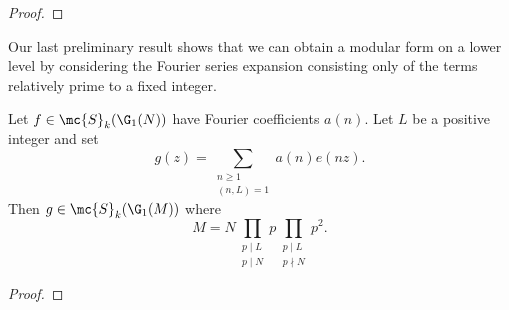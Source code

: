 \documentclass[12pt]{article}
\begin{document}
\begin{proof}

      \end{proof}

      Our last preliminary result shows that we can obtain a modular form on a lower level by considering the Fourier series expansion consisting only of the terms relatively prime to a fixed integer.

      \begin{lemma} %
        Let \(f \in \mc{S}_{k}(\G_{1}(N))\) have Fourier coefficients \(a(n)\). Let \(L\) be a positive integer and set
        \[
          g(z) = \sum_{\substack{n \ge 1 \\ (n,L) = 1}}a(n)e(nz).
        \]
        Then \(g \in \mc{S}_{k}(\G_{1}(M))\) where
        \[
          M = N\prod_{\substack{p \mid L \\ p \mid N}}p\prod_{\substack{p \mid L \\ p \nmid N}}p^{2}.
        \]
      \end{lemma}
      \begin{proof}
      \end{proof}
\end{document}
